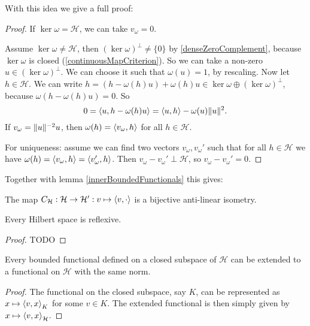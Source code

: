 With this idea we give a full proof:
\begin{proof}
If $\ker\omega = \mathcal{H}$, we can take $v_\omega = 0$.

Assume $\ker\omega\neq \mathcal{H}$, then $(\ker\omega)^\perp\neq \{0\}$ by \ref{denseZeroComplement}, because $\ker\omega$ is closed (\ref{continuousMapCriterion}). So we can take a non-zero $u\in (\ker\omega)^\perp$. We can choose it such that $\omega(u) = 1$, by rescaling. Now let $h\in\mathcal{H}$. We can write $h = (h - \omega(h)u)+\omega(h)u\in\ker\omega\oplus (\ker\omega)^\perp$, because $\omega(h - \omega(h)u) = 0$. So
\[ 0 = \left\langle u,h - \omega(h)u \right\rangle = \left\langle u,h \right\rangle - \omega(u)\lVert u\rVert^2. \]
If $v_\omega = \lVert u\rVert^{-2}u$, then $\omega(h) = \left\langle v_\omega, h \right\rangle$ for all $h\in\mathcal{H}$.

For uniqueness: assume we can find two vectors $v_\omega,v_\omega'$ such that for all $h\in\mathcal{H}$ we have $\omega(h) = \left\langle v_\omega, h \right\rangle = \left\langle v_\omega', h \right\rangle$. Then $v_\omega - v_\omega'\perp \mathcal{H}$, so $v_\omega - v_\omega'= 0$.
\end{proof}
Together with lemma \ref{innerBoundedFunctionals} this gives:
\begin{corollary} \label{RieszIsometry}
The map $C_\mathcal{H}:\mathcal{H}\to {\mathcal{H}}^\prime: v\mapsto \left\langle v,\cdot \right\rangle$ is a bijective anti-linear isometry.
\end{corollary}
\begin{corollary}
Every Hilbert space is reflexive.
\end{corollary}
\begin{proof}
TODO
\end{proof}
\begin{corollary}
Every bounded functional defined on a closed subspace of $\mathcal{H}$ can be extended to a functional on $\mathcal{H}$ with the same norm.
\end{corollary}
\begin{proof}
The functional on the closed subspace, say $K$, can be represented as $x\mapsto \left\langle v,x \right\rangle_K$ for some $v\in K$. The extended functional is then simply given by $x\mapsto \left\langle v,x \right\rangle_\mathcal{H}$.
\end{proof}

